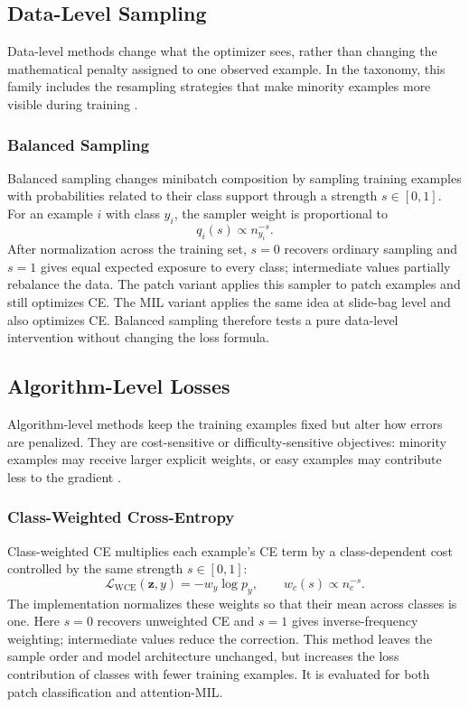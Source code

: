 \documentclass[11pt]{article}
\begin{document}
\subsection{Data-Level Sampling}
Data-level methods change what the optimizer sees, rather than changing the mathematical penalty assigned to one observed example. In the taxonomy, this family includes the resampling strategies that make minority examples more visible during training \citep{saini2023tacklingClass}.

\subsubsection{Balanced Sampling}
Balanced sampling changes minibatch composition by sampling training examples with probabilities related to their class support through a strength $s\in[0,1]$. For an example $i$ with class $y_i$, the sampler weight is proportional to
\begin{equation}
  q_i(s) \propto n_{y_i}^{-s}.
  \label{eq:balanced-sampling}
\end{equation}
After normalization across the training set, $s=0$ recovers ordinary sampling and $s=1$ gives equal expected exposure to every class; intermediate values partially rebalance the data. The patch variant applies this sampler to patch examples and still optimizes CE. The MIL variant applies the same idea at slide-bag level and also optimizes CE. Balanced sampling therefore tests a pure data-level intervention without changing the loss formula.

\subsection{Algorithm-Level Losses}
Algorithm-level methods keep the training examples fixed but alter how errors are penalized. They are cost-sensitive or difficulty-sensitive objectives: minority examples may receive larger explicit weights, or easy examples may contribute less to the gradient \citep{saini2023tacklingClass,scholz2024imbalanceAware}.

\subsubsection{Class-Weighted Cross-Entropy}
Class-weighted CE multiplies each example's CE term by a class-dependent cost controlled by the same strength $s\in[0,1]$:
\begin{equation}
  \mathcal{L}_{\mathrm{WCE}}(\mathbf{z},y) = -w_y\log p_y,
  \qquad
  w_c(s) \propto n_c^{-s}.
  \label{eq:weighted-ce}
\end{equation}
The implementation normalizes these weights so that their mean across classes is one. Here $s=0$ recovers unweighted CE and $s=1$ gives inverse-frequency weighting; intermediate values reduce the correction. This method leaves the sample order and model architecture unchanged, but increases the loss contribution of classes with fewer training examples. It is evaluated for both patch classification and attention-MIL.
\end{document}
